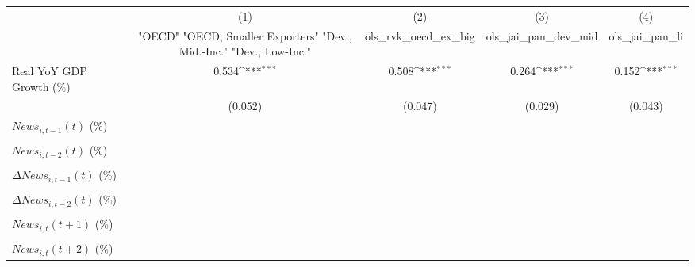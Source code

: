 {
\def\sym#1{\ifmmode^{#1}\else\(^{#1}\)\fi}
\begin{tabular}{l*{4}{c}}
\toprule
                    &\multicolumn{1}{c}{(1)}&\multicolumn{1}{c}{(2)}&\multicolumn{1}{c}{(3)}&\multicolumn{1}{c}{(4)}\\
                    &\multicolumn{1}{c}{ "OECD" "OECD, Smaller Exporters" "Dev., Mid.-Inc." "Dev., Low-Inc."}&\multicolumn{1}{c}{ols_rvk_oecd_ex_big}&\multicolumn{1}{c}{ols_jai_pan_dev_mid}&\multicolumn{1}{c}{ols_jai_pan_li}\\
\midrule
Real YoY GDP Growth (\%)&       0.534\sym{***}&       0.508\sym{***}&       0.264\sym{***}&       0.152\sym{***}\\
                    &     (0.052)         &     (0.047)         &     (0.029)         &     (0.043)         \\
\addlinespace
$ News_{i,t-1}(t)$ (\%)&                     &                     &                     &                     \\
                    &                     &                     &                     &                     \\
\addlinespace
$ News_{i,t-2}(t)$ (\%)&                     &                     &                     &                     \\
                    &                     &                     &                     &                     \\
\addlinespace
$ \Delta News_{i,t-1}(t)$ (\%)&                     &                     &                     &                     \\
                    &                     &                     &                     &                     \\
\addlinespace
$ \Delta News_{i,t-2}(t)$ (\%)&                     &                     &                     &                     \\
                    &                     &                     &                     &                     \\
\addlinespace
$ News_{i,t}(t+1)$ (\%)&                     &                     &                     &                     \\
                    &                     &                     &                     &                     \\
\addlinespace
$ News_{i,t}(t+2)$ (\%)&                     &                     &                     &                     \\

\end{tabular}}
